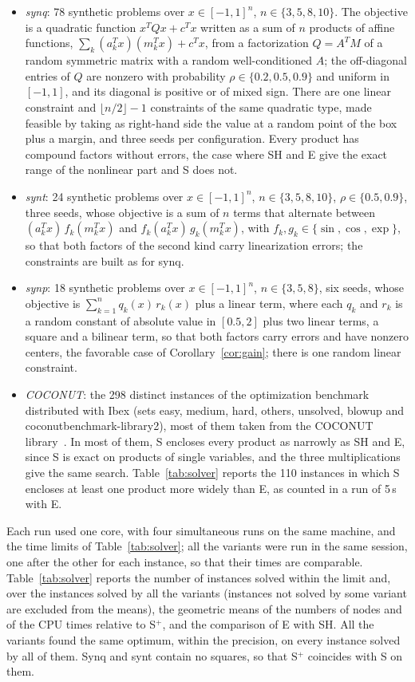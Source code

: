 \documentclass[10pt]{article}
\theoremstyle{definition}
\begin{document}
\begin{itemize}
\item \emph{synq}: 78 synthetic problems over $x\in[-1,1]^n$, $n\in\{3,5,8,10\}$. The objective is a quadratic function $x^TQx+c^Tx$ written as a sum of $n$ products of affine functions, $\sum_k(a_k^Tx)(m_k^Tx)+c^Tx$, from a factorization $Q=A^TM$ of a random symmetric matrix with a random well-conditioned $A$; the off-diagonal entries of $Q$ are nonzero with probability $\rho\in\{0.2,0.5,0.9\}$ and uniform in $[-1,1]$, and its diagonal is positive or of mixed sign. There are one linear constraint and $\lfloor n/2\rfloor-1$ constraints of the same quadratic type, made feasible by taking as right-hand side the value at a random point of the box plus a margin, and three seeds per configuration. Every product has compound factors without errors, the case where SH and E give the exact range of the nonlinear part and S does not.
\item \emph{synt}: 24 synthetic problems over $x\in[-1,1]^n$, $n\in\{3,5,8,10\}$, $\rho\in\{0.5,0.9\}$, three seeds, whose objective is a sum of $n$ terms that alternate between $(a_k^Tx)\,f_k(m_k^Tx)$ and $f_k(a_k^Tx)\,g_k(m_k^Tx)$, with $f_k,g_k\in\{\sin,\cos,\exp\}$, so that both factors of the second kind carry linearization errors; the constraints are built as for synq.
\item \emph{synp}: 18 synthetic problems over $x\in[-1,1]^n$, $n\in\{3,5,8\}$, six seeds, whose objective is $\sum_{k=1}^n q_k(x)\,r_k(x)$ plus a linear term, where each $q_k$ and $r_k$ is a random constant of absolute value in $[0.5,2]$ plus two linear terms, a square and a bilinear term, so that both factors carry errors and have nonzero centers, the favorable case of Corollary~\ref{cor:gain}; there is one random linear constraint.
\item \emph{COCONUT}: the 298 distinct instances of the optimization benchmark distributed with Ibex (sets easy, medium, hard, others, unsolved, blowup and coconutbenchmark-library2), most of them taken from the COCONUT library~\cite{coconut}. In most of them, S encloses every product as narrowly as SH and E, since S is exact on products of single variables, and the three multiplications give the same search. Table~\ref{tab:solver} reports the 110 instances in which S encloses at least one product more widely than E, as counted in a run of 5\,s with E.
\end{itemize}
Each run used one core, with four simultaneous runs on the same machine, and the time limits of Table~\ref{tab:solver}; all the variants were run in the same session, one after the other for each instance, so that their times are comparable. Table~\ref{tab:solver} reports the number of instances solved within the limit and, over the instances solved by all the variants (instances not solved by some variant are excluded from the means), the geometric means of the numbers of nodes and of the CPU times relative to S$^+$, and the comparison of E with SH. All the variants found the same optimum, within the precision, on every instance solved by all of them. Synq and synt contain no squares, so that S$^+$ coincides with S on them.
\end{document}
